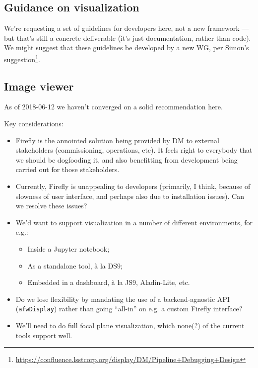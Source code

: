 \documentclass[DM,authoryear,toc,lsstdraft]{lsstdoc}
\begin{document}

\subsection{Guidance on visualization}


We're requesting a set of guidelines for developers here, not a new framework
--- but that's still a concrete deliverable (it's just documentation, rather
than code). We might suggest that these guidelines be developed by a new WG,
per Simon's
suggestion\footnote{\url{https://confluence.lsstcorp.org/display/DM/Pipeline+Debugging+Design}}.

\subsection{Image viewer}


As of 2018-06-12 we haven't converged on a solid recommendation here.

Key considerations:

\begin{itemize}

  \item{Firefly is the annointed solution being provided by DM to external
  stakeholders (commissioning, operations, etc). It feels right to everybody
  that we should be dogfooding it, and also benefitting from development being
  carried out for those stakeholders.}

  \item{Currently, Firefly is unappealing to developers (primarily, I think,
  because of slowness of user interface, and perhaps also due to installation
  issues). Can we resolve these issues?}

  \item{We'd want to support visualization in a number of different
  environments, for e.g.:

    \begin{itemize}

      \item{Inside a Jupyter notebook;}
      \item{As a standalone tool, \`a la DS9;}
      \item{Embedded in a \gls{dashboard}, \`a la JS9, Aladin-Lite, etc.}

    \end{itemize}
  }

  \item{Do we lose flexibility by mandating the use of a backend-agnostic API
  (\texttt{afwDisplay}) rather than going ``all-in'' on e.g. a custom Firefly
  interface?}

  \item{We'll need to do full focal plane visualization, which none(?) of the
  current tools support well.}

\end{itemize}
\end{document}
